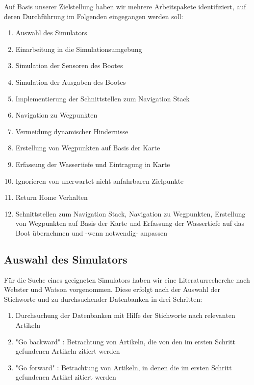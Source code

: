 \documentclass[11pt]{article}
\begin{document}
Auf Basis unserer Zielstellung haben wir mehrere Arbeitspakete identifiziert, auf deren Durchführung im Folgenden eingegangen werden soll:
\begin{enumerate}
	\item Auswahl des Simulators
	\item Einarbeitung in die Simulationsumgebung
	\item Simulation der Sensoren des Bootes
	\item Simulation der Ausgaben des Bootes
	\item Implementierung der Schnittstellen zum Navigation Stack
	\item Navigation zu Wegpunkten
	\item Vermeidung dynamischer Hindernisse
	\item Erstellung von Wegpunkten auf Basis der Karte
	\item Erfassung der Wassertiefe und Eintragung in Karte
	\item Ignorieren von unerwartet nicht anfahrbaren Zielpunkte
	\item Return Home Verhalten
	\item Schnittstellen zum Navigation Stack, Navigation zu Wegpunkten, Erstellung von Wegpunkten auf Basis der Karte und Erfassung der Wassertiefe auf das Boot übernehmen und -wenn notwendig- anpassen
\end{enumerate}

\subsection{Auswahl des Simulators}

Für die Suche eines geeigneten Simulators haben wir eine Literaturrecherche nach Webster und Watson \cite{webster2002} vorgenommen. Diese erfolgt nach der Auswahl der Stichworte und zu durchsuchender Datenbanken in drei Schritten:

\begin{enumerate}
	\item Durchsuchung der Datenbanken mit Hilfe der Stichworte nach relevanten Artikeln
	\item "Go backward" \cite{webster2002}: Betrachtung von Artikeln, die von den im ersten Schritt gefundenen Artikeln zitiert werden
	\item "Go forward" \cite{webster2002}: Betrachtung von Artikeln, in denen die im ersten Schritt gefundenen Artikel zitiert werden
\end{enumerate}
\end{document}
